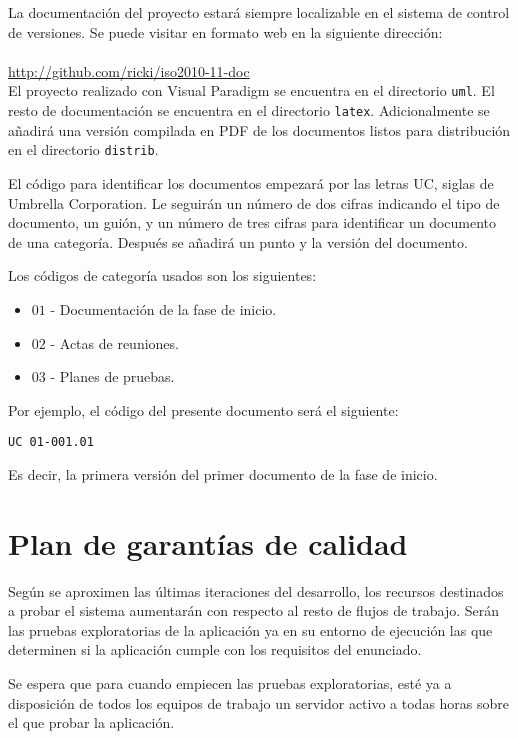 La documentación del proyecto estará siempre localizable en el sistema de
control de versiones. Se puede visitar en formato web en la siguiente
dirección:\\
\\
{\small
\url{http://github.com/ricki/iso2010-11-doc}
}\\

El proyecto realizado con Visual Paradigm se encuentra en el directorio
\texttt{uml}. El resto de documentación se encuentra en el directorio
\texttt{latex}. Adicionalmente se añadirá una versión compilada en PDF de los
documentos listos para distribución en el directorio \texttt{distrib}.

El código para identificar los documentos empezará por las letras UC, siglas de
Umbrella Corporation. Le seguirán un número de dos cifras indicando el tipo de
documento, un guión, y un número de tres cifras para identificar un documento
de una categoría. Después se añadirá un punto y la versión del documento.

Los códigos de categoría usados son los siguientes:

\begin{itemize}
\item $01$ - Documentación de la fase de inicio.
\item $02$ - Actas de reuniones.
\item $03$ - Planes de pruebas.
\end{itemize}

Por ejemplo, el código del presente documento será el siguiente:

\begin{center}
\texttt{UC 01-001.01}
\end{center}

Es decir, la primera versión del primer documento de la fase de inicio.

\section{Plan de garantías de calidad}

Según se aproximen las últimas iteraciones del desarrollo, los recursos
destinados a probar el sistema aumentarán con respecto al resto de flujos de
trabajo. Serán las pruebas exploratorias de la aplicación ya en su entorno de
ejecución las que determinen si la aplicación cumple con los requisitos del
enunciado.

Se espera que para cuando empiecen las pruebas exploratorias, esté ya a
disposición de todos los equipos de trabajo un servidor activo a todas horas
sobre el que probar la aplicación.

